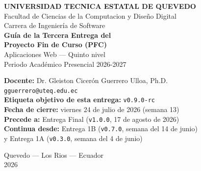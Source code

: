 \documentclass[11pt,a4paper]{article}
\begin{document}
\begin{center}
    \vspace*{1.5cm}
    {\Large\bfseries\textcolor{uteqverde}{UNIVERSIDAD TECNICA ESTATAL DE QUEVEDO}}\\[4pt]
    {\large Facultad de Ciencias de la Computacion y Dise\~{n}o Digital}\\[2pt]
    {\large Carrera de Ingenier\'{i}a de Software}\\[24pt]

    {\LARGE\bfseries Gu\'{i}a de la Tercera Entrega del}\\[6pt]
    {\LARGE\bfseries Proyecto Fin de Curso (PFC)}\\[18pt]

    {\large Aplicaciones Web --- Quinto nivel}\\[2pt]
    {\large Periodo Acad\'{e}mico Presencial 2026-2027}\\[24pt]

    \begin{tcolorbox}[colback=uteqverde!8,colframe=uteqverde,arc=3pt,
                      width=0.88\textwidth,boxrule=0.8pt]
        \centering
        \textbf{Docente:} Dr. Gleiston Cicer\'on Guerrero Ulloa, Ph.D.\\[2pt]
        \texttt{gguerrero@uteq.edu.ec}\\[6pt]
        \textbf{Etiqueta objetivo de esta entrega:} \texttt{v0.9.0-rc}\\[2pt]
        \textbf{Fecha de cierre:} viernes 24 de julio de 2026 (semana 13)\\[2pt]
        \textbf{Precede a:} Entrega Final (\texttt{v1.0.0}, 17 de agosto de 2026)\\[2pt]
        \textbf{Continua desde:} Entrega 1B (\texttt{v0.7.0}, semana del 14 de junio)\\ y Entrega 1A (\texttt{v0.3.0}, semana del 4 de junio)
    \end{tcolorbox}

    \vfill

    {\small Quevedo --- Los Rios --- Ecuador}\\[2pt]
    {\small 2026}
\end{center}

\newpage

\end{document}
